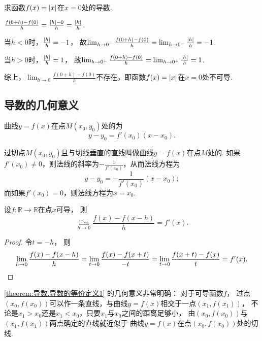 \begin{example}
求函数\(f(x) = \abs{x}\)在\(x=0\)处的导数.
\begin{solution}
\(\frac{f(0+h)-f(0)}{h} = \frac{\abs{h}-0}{h} = \frac{\abs{h}}{h}\).

当\(h < 0\)时，\(\frac{\abs{h}}{h} = -1\)，
故\(\lim_{h\to0^-}\frac{f(0+h)-f(0)}{h}
= \lim_{h\to0^-}\frac{\abs{h}}{h} = -1\).

当\(h > 0\)时，\(\frac{\abs{h}}{h} = 1\)，
故\(\lim_{h\to0^+}\frac{f(0+h)-f(0)}{h}
= \lim_{h\to0^+}\frac{\abs{h}}{h} = 1\).

综上，\(\lim_{h\to0}\frac{f(0+h)-f(0)}{h}\)不存在，即函数\(f(x) = \abs{x}\)在\(x = 0\)处不可导.
\end{solution}
\end{example}

\subsection{导数的几何意义}
曲线\(y=f(x)\)在点\(M(x_0,y_0)\)处的为\[
	y-y_0=f'(x_0)(x-x_0).
\]

过切点\(M(x_0,y_0)\)且与切线垂直的直线叫做曲线\(y=f(x)\)在点\(M\)处的.
如果\(f'(x_0) \neq 0\)，则法线的斜率为\(-\frac{1}{f'(x_0)}\)，从而法线方程为\[
	y-y_0=-\frac{1}{f'(x_0)}(x-x_0);
\]
而如果\(f'(x_0) = 0\)，则法线方程为\(x = x_0\).

\begin{proposition}\label{theorem:导数.导数的等价定义1}
设\(f\colon\mathbb{R}\to\mathbb{R}\)在点\(x\)可导，
则\[
	\lim_{h\to0} \frac{f(x)-f(x-h)}{h}
	= f'(x).
\]
\begin{proof}
令\(t=-h\)，
则\[
	\lim_{h\to0} \frac{f(x)-f(x-h)}{h}
	= \lim_{t\to0} \frac{f(x)-f(x+t)}{-t}
	= \lim_{t\to0} \frac{f(x+t)-f(x)}{t}
	= f'(x).
	\qedhere
\]
\end{proof}
\end{proposition}
\cref{theorem:导数.导数的等价定义1} 的几何意义非常明确：
对于可导函数\(f\)，
过点\((x_0,f(x_0))\)可以作一条直线，与曲线\(y=f(x)\)相交于一点\((x_1,f(x_1))\)，
不论是\(x_1>x_0\)还是\(x_1<x_0\)，只要\(x_1\)与\(x_0\)之间的距离足够小，
由\((x_0,f(x_0))\)与\((x_1,f(x_1))\)两点确定的直线就近似于
曲线\(y=f(x)\)在点\((x_0,f(x_0))\)处的切线.


